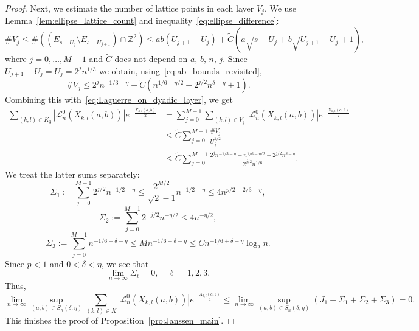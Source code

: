 \documentclass[10pt,a4paper]{amsart}
\newcommand{\Z}{{\mathbb Z}}
\begin{document}
\begin{proof}
    Next, we estimate the number of lattice points in each layer $V_j$. We use Lemma~\ref{lem:ellipse_lattice_count} and inequality~\eqref{eq:ellipse_difference}:
    \begin{equation}
        \#V_j \leq \#((E_{s-U_j}\setminus E_{s-U_{j+1}})\cap \Z^2) \leq ab (U_{j+1}-U_{j}) + \widetilde{C} \left(a \sqrt{s-U_j} + b \sqrt{U_{j+1}-U_{j}} +1\right),
    \end{equation}
    where $j=0,\dots,M-1$ and $\widetilde{C}$ does not depend on $a, \, b, \, n, \, j$. Since $U_{j+1}-U_j = U_j = 2^j n^{1/3}$ we obtain, using~\eqref{eq:ab_bounds_revisited},
    \begin{equation}
        \#V_j \leq 2^j n^{-1/3-\eta} + \widetilde{C} (n^{1/6-\eta/2} + 2^{j/2} n^{\delta-\eta} +1).
    \end{equation}
    Combining this with~\eqref{eq:Laguerre_on_dyadic_layer}, we get
    \begin{align}
        \sum\limits_{(k,l)\in K_3} |\mathcal{L}_n^{0}(X_{k,l}(a,b))|e^{-\frac{X_{k,l}(a,b)}{2}}
        & = \sum\limits_{j=0}^{M-1} \sum\limits_{(k,l)\in V_j}
        |\mathcal{L}_n^{0}(X_{k,l}(a,b))|e^{-\frac{X_{k,l}(a,b)}{2}}\\
        & \leq \widetilde{C} \sum\limits_{j=0}^{M-1} \frac{\#V_j}{U_j^{1/2}}\\
        & \leq \widetilde{C} \sum\limits_{j=0}^{M-1}  \frac{2^j n^{-1/3-\eta} + n^{1/6-\eta/2} + 2^{j/2} n^{\delta-\eta}}{2^{j/2}n^{1/6}}. 
    \end{align}
    We treat the latter sums separately:
    \begin{equation}
        \Sigma_1 := \sum\limits_{j=0}^{M-1} 2^{j/2}n^{-1/2-\eta}
        \leq \frac{2^{M/2}}{\sqrt{2}-1} n^{-1/2-\eta}
        \leq 4n^{p/2-2/3-\eta},
    \end{equation}
    \begin{equation}
        \Sigma_2 := \sum\limits_{j=0}^{M-1} 2^{-j/2}n^{-\eta/2}
        \leq 4n^{-\eta/2},
    \end{equation}
    \begin{equation}
        \Sigma_3 := \sum\limits_{j=0}^{M-1} n^{-1/6+\delta-\eta}
        \leq M n^{-1/6+\delta-\eta}
         \leq C n^{-1/6+\delta-\eta} \log_2 n.
    \end{equation}
    Since $p<1$ and  $0 < \delta < \eta$, we see that
    \begin{equation}
        \lim_{n \to \infty} \Sigma_\ell = 0, \quad \ell = 1,2,3.
    \end{equation}
Thus, 
\begin{equation}
     \lim\limits_{n \to \infty} \sup\limits_{(a,b) \in S_n(\delta, \eta)} \sum\limits_{(k,l)\in K} |\mathcal{L}_n^{0}(X_{k,l}(a,b))|e^{-\frac{X_{k,l}(a,b)}{2}} \leq \lim_{n \to \infty} \sup\limits_{(a,b) \in S_n(\delta, \eta)} (J_1 + \Sigma_1 +\Sigma_2+ \Sigma_3) = 0.
\end{equation}
This finishes the proof of Proposition~\ref{pro:Janssen_main}.
\end{proof}
\end{document}
